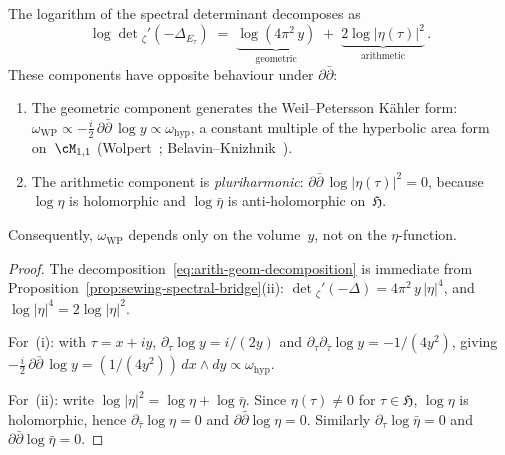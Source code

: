 \begin{proposition}%
\label{prop:arith-geom-decomposition}%
\ClaimStatusProvedHere%
%
The logarithm of the spectral determinant decomposes as
\begin{equation}\label{eq:arith-geom-decomposition}
 \log\det{}_\zeta'\!(-\Delta_{E_\tau})
 \;=\;
 \underbrace{\log(4\pi^2\,y)}_{\text{geometric}}
 \;+\;
 \underbrace{2\log\lvert\eta(\tau)\rvert^2}_{\text{arithmetic}}\,.
\end{equation}
These components have opposite behaviour under
$\partial\bar\partial$:
\begin{enumerate}[label=\textup{(\roman*)}]
\item The geometric component generates the Weil--Petersson
 K\"ahler form:
 $\omega_{\mathrm{WP}}
 \propto -\tfrac{i}{2}\,\partial\bar\partial\,\log y
 \propto \omega_{\mathrm{hyp}}$,
 a constant multiple of the hyperbolic area form
 on~$\cM_{1,1}$
 \textup{(}Wolpert~\textup{\cite{Wolpert1985}};
 Belavin--Knizhnik~\textup{\cite{BK1986}}\textup{)}.
\item The arithmetic component is
 \emph{pluriharmonic}:
 $\partial\bar\partial\,\log\lvert\eta(\tau)\rvert^2 = 0$,
 because $\log\eta$ is holomorphic and $\log\bar\eta$ is
 anti-holomorphic on~$\mathfrak{H}$.
\end{enumerate}
Consequently, $\omega_{\mathrm{WP}}$ depends only on
the volume~$y$, not on the $\eta$-function.
\end{proposition}

\begin{proof}
The decomposition~\eqref{eq:arith-geom-decomposition} is
immediate from
Proposition~\ref{prop:sewing-spectral-bridge}(ii):
$\det{}_\zeta'(-\Delta) = 4\pi^2\,y\,\lvert\eta\rvert^4$,
and $\log\lvert\eta\rvert^4 = 2\log\lvert\eta\rvert^2$.

For~(i): with $\tau = x + iy$,
$\partial_\tau\log y = i/(2y)$ and
$\partial_\tau\partial_{\bar\tau}\log y = -1/(4y^2)$,
giving
$-\tfrac{i}{2}\,\partial\bar\partial\,\log y
= (1/(4y^2))\,dx\wedge dy \propto \omega_{\mathrm{hyp}}$.

For~(ii): write
$\log\lvert\eta\rvert^2 = \log\eta + \log\bar\eta$.
Since $\eta(\tau)\ne 0$ for $\tau\in\mathfrak{H}$,
$\log\eta$ is holomorphic, hence
$\partial_{\bar\tau}\log\eta = 0$ and
$\partial\bar\partial\log\eta = 0$. Similarly
$\partial_\tau\log\bar\eta = 0$ and
$\partial\bar\partial\log\bar\eta = 0$.
\end{proof}

